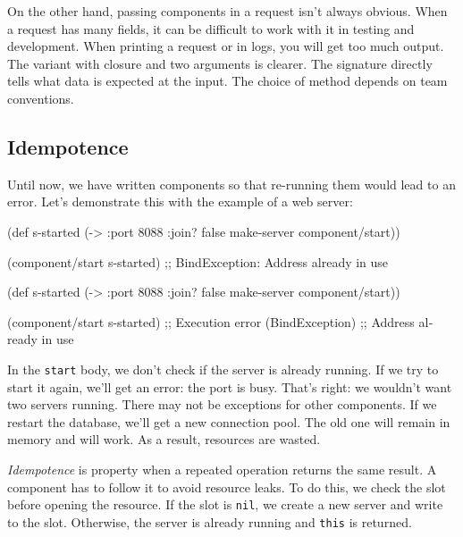 On the other hand, passing components in a request isn't always obvious. When a request has many fields, it can be difficult to work with it in testing and development. When printing a request or in logs, you will get too much output. The variant with closure and two arguments is clearer. The signature directly tells what data is expected at the input. The choice of method depends on team conventions.

\subsection{Idempotence}

Until now, we have written components so that re-running them would lead to an error. Let's demonstrate this with the example of a web server:

\ifnarrow

\begin{english}
  \begin{clojure}
(def s-started
  (-> {:port 8088 :join? false}
      make-server
      component/start))

(component/start s-started)
;; BindException: Address already in use
  \end{clojure}
\end{english}

\else

\begin{english}
  \begin{clojure}
(def s-started (-> {:port 8088 :join? false}
                    make-server
                    component/start))

(component/start s-started)
;; Execution error (BindException)
;; Address already in use
  \end{clojure}
\end{english}

\fi

In the \verb|start| body, we don't check if the server is already running. If we try to start it again, we'll get an error: the port is busy. That's right: we wouldn't want two servers running. There may not be exceptions for other components. If we restart the database, we'll get a new connection pool. The old one will remain in memory and will work. As a result, resources are wasted.


\emph{Idempotence} is property when a repeated operation returns the same result. A component has to follow it to avoid resource leaks. To do this, we check the slot before opening the resource. If the slot is \verb|nil|, we create a new server and write to the slot. Otherwise, the server is already running and \verb|this| is returned.

